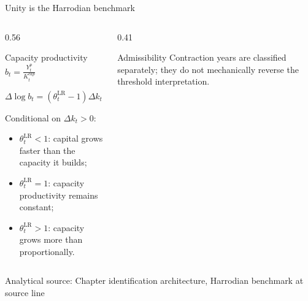 \documentclass[10pt,aspectratio=169]{beamer}
\newcommand{\LR}{\mathrm{LR}}
\newcommand{\sourcefooter}[1]{%
  \par\vfill{\tiny\color{gray!70}Analytical source: #1}\vspace{-0.35em}}
\begin{document}
\begin{frame}{Unity is the Harrodian benchmark}
  \begin{columns}[T,onlytextwidth]
    \begin{column}{0.56\textwidth}
      \begin{block}{Capacity productivity}
        \centering
        $\displaystyle b_t=\frac{Y_t^p}{K_t^{cap}}$

        \vspace{0.5em}
        \Large
        $\displaystyle
        \Delta\log b_t
        =\left(\theta_t^{\LR}-1\right)\Delta k_t$
      \end{block}
      \small Conditional on $\Delta k_t>0$:
      \begin{itemize}
        \item $\theta_t^{\LR}<1$: capital grows faster than the capacity it builds;
        \item $\theta_t^{\LR}=1$: capacity productivity remains constant;
        \item $\theta_t^{\LR}>1$: capacity grows more than proportionally.
      \end{itemize}
    \end{column}
    \begin{column}{0.41\textwidth}
      \centering
      \begin{alertblock}{Admissibility}
        Contraction years are classified separately; they do not mechanically reverse the threshold interpretation.
      \end{alertblock}
    \end{column}
  \end{columns}
  \sourcefooter{Chapter identification architecture, Harrodian benchmark at source line \LineHarrodianBenchmark}
\end{frame}
\end{document}
